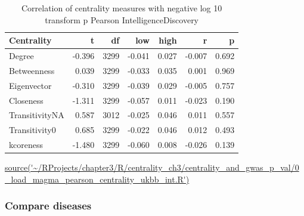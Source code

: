 \begin{table}[ht]
\centering
\begin{tabular}{lrrrrrr}
  \toprule
Centrality & t & df & low & high & r & p \\ 
  \midrule
Degree & -0.396 & 3299 & -0.041 & 0.027 & -0.007 & 0.692 \\ 
  Betweenness & 0.039 & 3299 & -0.033 & 0.035 & 0.001 & 0.969 \\ 
  Eigenvector & -0.310 & 3299 & -0.039 & 0.029 & -0.005 & 0.757 \\ 
  Closeness & -1.311 & 3299 & -0.057 & 0.011 & -0.023 & 0.190 \\ 
  TransitivityNA & 0.587 & 3012 & -0.025 & 0.046 & 0.011 & 0.557 \\ 
  Transitivity0 & 0.685 & 3299 & -0.022 & 0.046 & 0.012 & 0.493 \\ 
  kcoreness & -1.480 & 3299 & -0.060 & 0.008 & -0.026 & 0.139 \\ 
   \bottomrule
\end{tabular}
\caption{Correlation of centrality measures with negative log 10 transform p Pearson IntelligenceDiscovery} 
\tiny\url{source('~/RProjects/chapter3/R/centrality_ch3/centrality_and_gwas_p_val/0_load_magma_pearson_centrality_ukbb_int.R')}
\label{tab:Correlation of centrality measures with negative log 10 transform p Pearson IntelligenceDiscovery}
\end{table}
 


\subsubsection{Compare diseases}

